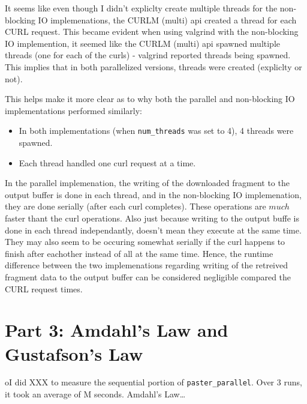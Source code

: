 \documentclass[12pt]{article}
\begin{document}
It seems like even though I didn't expliclty create multiple threads for the non-blocking IO implemenations, the CURLM (multi) api created a thread for each CURL request. This became evident when using valgrind with the non-blocking IO implemention, it seemed like the CURLM (multi) api spawned multiple threads (one for each of the curls) - valgrind reported threads being spawned. This implies that in both parallelized versions, threads were created (expliclty or not).

This helps make it more clear as to why both the parallel and non-blocking IO implementations performed similarly:
\begin{itemize}
\item In both implementations (when {\tt num\_threads} was set to 4), 4 threads were spawned.
\item Each thread handled one curl request at a time.
\end{itemize}

In the parallel implemenation, the writing of the downloaded fragment to the output buffer is done in each thread, and in the non-blocking IO implemenation, they are done serially (after each curl completes). These operations are $much$ faster thant the curl operations. Also just because writing to the output buffe is done in each thread independantly, doesn't mean they execute at the same time. They may also seem to be occuring somewhat serially if the curl happens to finish after eachother instead of all at the same time. Hence, the runtime difference between the two implemenations regarding writing of the retreived fragment data to the output buffer can be considered negligible compared the CURL request times.

\section*{Part 3: Amdahl's Law and Gustafson's Law}
oI did XXX to measure the sequential portion of {\tt paster\_parallel}. Over 3 runs,
it took an average of M seconds. Amdahl's Law\ldots
\end{document}
